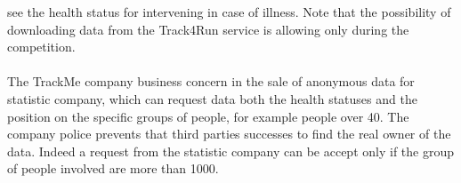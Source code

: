 see the health status for intervening in case of illness. Note that the possibility of downloading data from the Track4Run service is allowing only during the competition.\\\\ The TrackMe company business concern in the sale of anonymous data for statistic company, which can request data both the health statuses and the position on the specific groups of people, for example people over 40. The company police prevents that third parties successes to find the real owner of the data. Indeed a request from the statistic company can be accept only if the group of people involved are more than 1000.